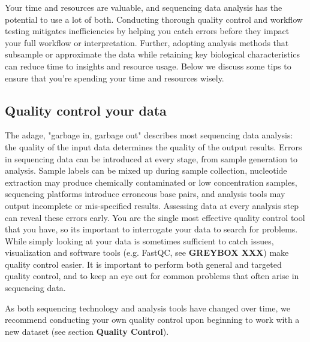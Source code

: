 \documentclass[10pt,letterpaper]{article}
\begin{document}
Your time and resources are valuable, and sequencing data analysis has the potential to use a lot of both. 
Conducting thorough quality control and workflow testing mitigates inefficiencies by helping you catch errors before they impact your full workflow or interpretation. 
Further, adopting analysis methods that subsample or approximate the data while retaining key biological characteristics can reduce time to insights and resource usage.
Below we discuss some tips to ensure that you're spending your time and resources wisely. 

\subsection*{Quality control your data} %

 
The adage, "garbage in, garbage out" describes most sequencing data analysis: the quality of the input data determines the quality of the output results. 
Errors in sequencing data can be introduced at every stage, from sample generation to analysis. 
Sample labels can be mixed up during sample collection, nucleotide extraction may produce chemically contaminated or low concentration samples, sequencing platforms introduce erroneous base pairs, and analysis tools may output incomplete or mis-specified results. 
Assessing data at every analysis step can reveal these errors early. 
You are the single most effective quality control tool that you have, so its important to interrogate your data to search for problems. 
While simply looking at your data is sometimes sufficient to catch issues, visualization and software tools (e.g. FastQC, see \textbf{GREYBOX XXX}) make quality control easier. 
It is important to perform both general and targeted quality control, and to keep an eye out for common problems that often arise in sequencing data. 

As both sequencing technology and analysis tools have changed over time, we recommend conducting your own quality control upon beginning to work with a new dataset (see section \textbf{Quality  Control}).
\end{document}

